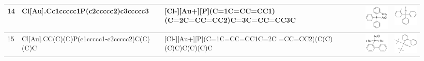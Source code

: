 \begin{landscape}
\begin{longtable}{m{0.3cm}m{6.7cm}m{7.7cm}m{2.3cm}m{2.3cm}}
 14 &
 Cl[Au].Cc1ccccc1P(c2ccccc2)c3ccccc3 & 
 [Cl-][Au+][P](C=1C=CC=CC1) (C=2C=CC=CC2)C=3C=CC=CC3C & 
 \includegraphics[width=2.2cm]{imagenes/sigmaAldrich/Chloro[diphenyl(o-tolyl)phosphine]gold(I).jpeg} & 
 \includegraphics[width=2.2cm]{imagenes/sciFinder/pdf/Chloro[diphenyl(o-tolyl)phosphine]gold(I).pdf} \\
\hline


 15 &
 Cl[Au].CC(C)(C)P(c1ccccc1-c2ccccc2)C(C)(C)C & 
 [Cl-][Au+][P](C=1C=CC=CC1C=2C =CC=CC2)(C(C)(C)C)C(C)(C)C & 
 \includegraphics[width=2.2cm]{imagenes/sigmaAldrich/Chloro[(1,1-biphenyl-2-yl)di-tert-butylphosphine]gold(I).png} & 
 \includegraphics[width=2.2cm]{imagenes/sciFinder/pdf/Chloro[(1,1-biphenyl-2-yl)di-tert-butylphosphine]gold(I).pdf} \\
\hline




\end{longtable}
\end{landscape}

